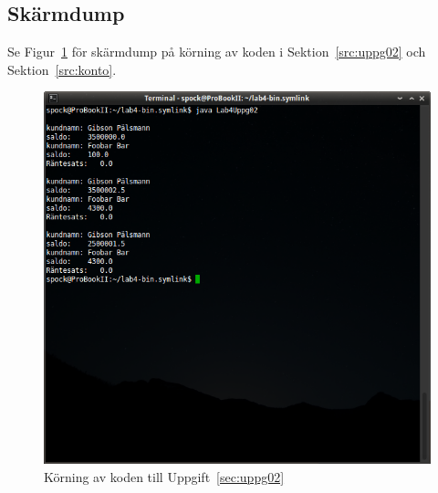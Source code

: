\subsection{Skärmdump}
Se Figur~\ref{fig:uppg02-screenshot} för skärmdump på körning av koden i
Sektion~\ref{src:uppg02} och Sektion~\ref{src:konto}.

\begin{figure}[htbp]
\centering
\includegraphics[width=\linewidth]{img/02.png}
\caption{Körning av koden till Uppgift~\ref{sec:uppg02}}
\label{fig:uppg02-screenshot}
\end{figure}

